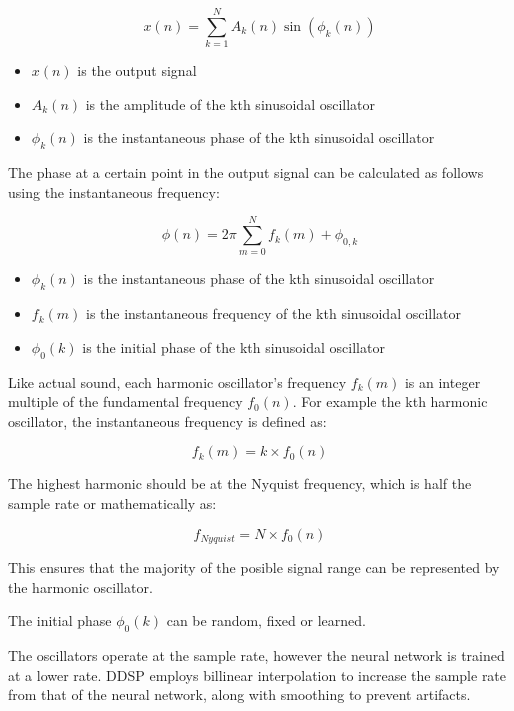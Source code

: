 \begin{equation}
    x(n) = \sum_{k=1}^{N} A_k(n) \sin(\phi_k(n))
\end{equation}

\begin{itemize}
    \item $x(n)$ is the output signal
    \item $A_k(n)$ is the amplitude of the kth sinusoidal oscillator
    \item $\phi_k(n)$ is the instantaneous phase of the kth sinusoidal oscillator
\end{itemize}

The phase at a certain point in the output signal can be calculated as follows using the instantaneous frequency:

\begin{equation}
    \phi(n) = 2\pi\sum_{m=0}^N f_k(m) + \phi_{0,k}
\end{equation}

\begin{itemize}
    \item $\phi_k(n)$ is the instantaneous phase of the kth sinusoidal oscillator
    \item $f_k(m)$ is the instantaneous frequency of the kth sinusoidal oscillator
    \item $\phi_0(k)$ is the initial phase of the kth sinusoidal oscillator
\end{itemize}

Like actual sound, each harmonic oscillator's frequency $f_k(m)$ is an integer multiple of the fundamental frequency $f_0(n)$. For example the kth harmonic oscillator, the instantaneous frequency is defined as:

\begin{equation}
    f_k(m) = k \times f_0(n)
\end{equation}

The highest harmonic should be at the Nyquist frequency, which is half the sample rate or mathematically as:

\begin{equation}
    f_{Nyquist} = N \times f_0(n)
\end{equation}

This ensures that the majority of the posible signal range can be represented by the harmonic oscillator.

The initial phase $\phi_0(k)$ can be random, fixed or learned\cite{OriginalDDSP}.

The oscillators operate at the sample rate, however the neural network is trained at a lower rate. DDSP employs billinear interpolation to increase the sample rate from that of the neural network, along with smoothing to prevent artifacts.

